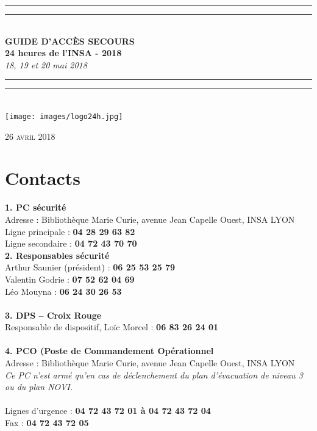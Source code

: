 \documentclass[hidelinks, paper=a4, fontsize=13pt]{report}
\begin{document}
\begin{center}
	\rule[0.5ex]{\linewidth}{2pt}\vspace*{-\baselineskip}\vspace*{3.2pt}
	\rule[0.5ex]{\linewidth}{1pt}\\[\baselineskip]
	\huge \textbf{GUIDE D'ACCÈS SECOURS\\24 heures de l'INSA - 2018} \\[4mm]
	{\Large \textit{18, 19 et 20 mai 2018}}\\
	\rule[0.5ex]{\linewidth}{1pt}\vspace*{-\baselineskip}\vspace{3.2pt}
	\rule[0.5ex]{\linewidth}{2pt}\\
	\vspace{30mm}
	\texttt{[image: images/logo24h.jpg]}\\
	
	\vspace{50mm}

\end{center}
	\begin{flushright}
		{\large\textsc{26 avril 2018}}
\end{flushright}

\chapter*{Contacts}

\textbf{1. PC sécurité}\\
Adresse : Bibliothèque Marie Curie, avenue Jean Capelle Ouest, INSA LYON\\
Ligne principale : \textbf{04 28 29 63 82}\\
Ligne secondaire : \textbf{04 72 43 70 70}\\

\textbf{2. Responsables sécurité}\\
Arthur Saunier (président) : \textbf{06 25 53 25 79}\\
Valentin Godrie : \textbf{07 52 62 04 69}\\
Léo Mouyna : \textbf{06 24 30 26 53}\\
\\

\textbf{3. DPS – Croix Rouge}\\
Responsable de dispositif, Loïc Morcel : \textbf{06 83 26 24 01}\\\\

\textbf{4. PCO (Poste de Commandement Opérationnel}\\
Adresse : Bibliothèque Marie Curie, avenue Jean Capelle Ouest, INSA LYON\\
\textit{Ce PC n’est armé qu'en cas de déclenchement du plan d'évacuation de niveau 3 ou du plan NOVI.\\\\
}Lignes d’urgence : 			\textbf{04 72 43 72 01   à 	04 72 43 72 04}\\
Fax : 					\textbf{04 72 43 72 05}\\
\end{document}
